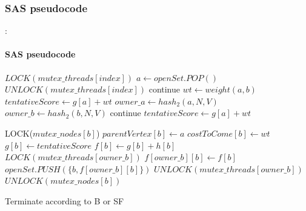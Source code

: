 \documentclass[12pt]{beamer}
\begin{document}
	\subsubsection{SAS pseudocode}
	\begin{frame}[allowframebreaks]{\secname : \subsecname}
		\framesubtitle{SAS pseudocode}
		\begin{algorithmic}[1]
        				\State $LOCK(mutex\_threads[index])$\;
        				\State $a \gets openSet.POP()$\;
        				\State $UNLOCK(mutex\_threads[index])$\;
      				\EndWhile
        			\State continue\;
      			\EndIf
        			\State $wt \gets weight(a, b)$\;
        			\State $tentativeScore \gets g[a] + wt$\;
          				\State $owner\_a \gets hash_2(a,N,V)$\;
          				\State $owner\_b \gets hash_2(b,N,V)$\;
					\EndIf
            			\State continue\;
          			\EndIf
          			\State $tentativeScore \gets g[a] + wt$\;

          			\State LOCK($mutex\_nodes[b]$)\;
					    \State $parentVertex[b] \gets a$\;
            			\State $costToCome[b] \gets wt$\;
            			\State $g[b] \gets tentativeScore$\;
            			\State $f[b] \gets g[b] + h[b]$\;
            			\State $LOCK(mutex\_threads[owner\_b])$\;
            			\State $f[owner\_b][b] \gets f[b]$\;
            			\State $openSet.PUSH(\{b, f[owner\_b][b]\})$\;
            			\State $UNLOCK(mutex\_threads[owner\_b])$\;
          			\EndIf
          			\State $UNLOCK(mutex\_nodes[b])$\;
        		\EndFor
				\EndWhile

        		\State Terminate according to B or SF\;
      		\EndIf
		  \EndFunction
		  \end{algorithmic}
	\end{frame}
\end{document}
